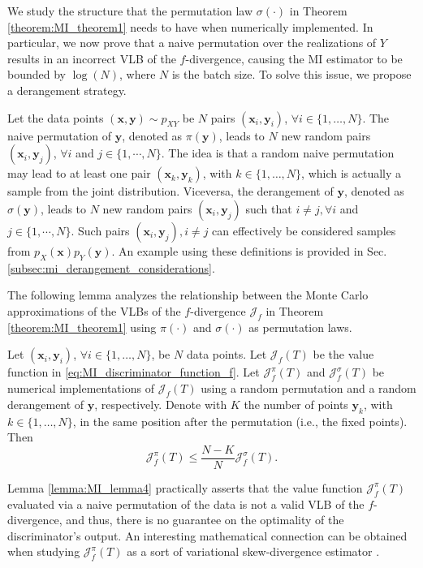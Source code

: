 We study the structure that the permutation law $\sigma(\cdot)$ in Theorem \ref{theorem:MI_theorem1} needs to have when numerically implemented. In particular, we now prove that a naive permutation over the realizations of $Y$ results in an incorrect VLB of the $f$-divergence, causing the MI estimator to be bounded by $\log(N)$, where $N$ is the batch size. To solve this issue, we propose a derangement strategy.  

Let the data points $(\mathbf{x},\mathbf{y}) \sim p_{XY}$ be $N$ pairs $(\mathbf{x}_i, \mathbf{y}_i)$, $\forall i\in \{1,\dots,N\}$. The naive permutation of $\mathbf{y}$, denoted as $\pi(\mathbf{y})$, leads to $N$ new random pairs $(\mathbf{x}_i, \mathbf{y}_j)$, $\forall i$ and $j \in \{ 1, \cdots , N\}$. The idea is that a random naive permutation may lead to at least one pair $(\mathbf{x}_k, \mathbf{y}_k)$, with $k \in \{1,\dots,N\}$, which is actually a sample from the joint distribution. 
Viceversa, the derangement of $\mathbf{y}$, denoted as $\sigma(\mathbf{y})$, leads to $N$ new random pairs $(\mathbf{x}_i, \mathbf{y}_j)$ such that $i \neq j, \forall i$ and $j \in \{ 1, \cdots , N\}$. Such pairs $(\mathbf{x}_i, \mathbf{y}_j), i \neq j$ can effectively be considered samples from $p_X(\mathbf{x})p_Y(\mathbf{y})$.
An example using these definitions is provided in Sec. \ref{subsec:mi_derangement_considerations}.

The following lemma analyzes the relationship between the Monte Carlo approximations of the VLBs of the $f$-divergence $\mathcal{J}_{f}$ in Theorem \ref{theorem:MI_theorem1} using $\pi(\cdot)$ and $\sigma(\cdot)$ as permutation laws.

\begin{lemma}
\label{lemma:MI_lemma4}
Let $(\mathbf{x}_i,\mathbf{y}_i)$, $\forall i\in \{1,\dots,N\}$, be $N$ data points. Let $\mathcal{J}_{f}(T)$ be the value function in \eqref{eq:MI_discriminator_function_f}. Let $\mathcal{J}_{f}^{\pi}(T)$ and $\mathcal{J}_{f}^{\sigma}(T)$ be numerical implementations of $\mathcal{J}_{f}(T)$ using a random permutation and a random derangement of $\mathbf{y}$, respectively. Denote with $K$ the number of points $\mathbf{y}_k$, with $k \in \{1,\dots, N\}$, in the same position after the permutation (i.e., the fixed points). Then
\begin{equation}
\mathcal{J}_{f}^{\pi}(T) \leq \frac{N-K}{N} \mathcal{J}_{f}^{\sigma}(T).
\label{eq:MI_perm_vs_derang}
\end{equation}
\end{lemma}
Lemma \ref{lemma:MI_lemma4} practically asserts that the value function $\mathcal{J}_{f}^{\pi}(T)$ evaluated via a naive permutation of the data is not a valid VLB of the $f$-divergence, and thus, there is no guarantee on the optimality of the discriminator's output. 
An interesting mathematical connection can be obtained when studying $\mathcal{J}_{f}^{\pi}(T)$ as a sort of variational skew-divergence estimator \cite{RenyiCL}.

